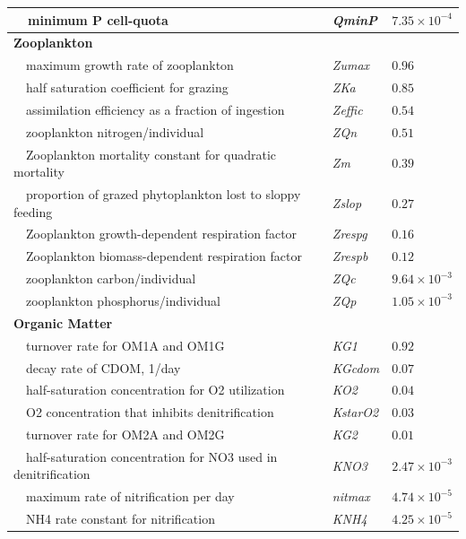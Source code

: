 \documentclass[letterpaper,12pt,oneside]{article}\usepackage[]{graphicx}\usepackage[]{color}
\begin{document}
\begin{table}[!tbp]
{\begin{center}
\begin{tabular}{lll}
~~minimum P cell-quota&\textit{QminP}&$7.35\times 10^{-4}$\tabularnewline
\hline
{\bfseries Zooplankton}&&\tabularnewline
~~maximum growth rate of zooplankton&\textit{Zumax}&$0.96$\tabularnewline
~~half saturation coefficient for grazing&\textit{ZKa}&$0.85$\tabularnewline
~~assimilation efficiency as a fraction of ingestion&\textit{Zeffic}&$0.54$\tabularnewline
~~zooplankton nitrogen/individual&\textit{ZQn}&$0.51$\tabularnewline
~~Zooplankton mortality constant for quadratic mortality&\textit{Zm}&$0.39$\tabularnewline
~~proportion of grazed phytoplankton lost to sloppy feeding&\textit{Zslop}&$0.27$\tabularnewline
~~Zooplankton growth-dependent respiration factor&\textit{Zrespg}&$0.16$\tabularnewline
~~Zooplankton biomass-dependent respiration factor&\textit{Zrespb}&$0.12$\tabularnewline
~~zooplankton carbon/individual&\textit{ZQc}&$9.64\times 10^{-3}$\tabularnewline
~~zooplankton phosphorus/individual&\textit{ZQp}&$1.05\times 10^{-3}$\tabularnewline
\hline
{\bfseries Organic Matter}&&\tabularnewline
~~turnover rate for OM1A and OM1G&\textit{KG1}&$0.92$\tabularnewline
~~decay rate of CDOM, 1/day&\textit{KGcdom}&$0.07$\tabularnewline
~~half-saturation concentration for O2 utilization&\textit{KO2}&$0.04$\tabularnewline
~~O2 concentration that inhibits denitrification&\textit{KstarO2}&$0.03$\tabularnewline
~~turnover rate for OM2A and OM2G&\textit{KG2}&$0.01$\tabularnewline
~~half-saturation concentration for NO3 used in denitrification&\textit{KNO3}&$2.47\times 10^{-3}$\tabularnewline
~~maximum rate of nitrification per day&\textit{nitmax}&$4.74\times 10^{-5}$\tabularnewline
~~NH4 rate constant for nitrification&\textit{KNH4}&$4.25\times 10^{-5}$\tabularnewline
\hline
\end{tabular}\end{center}}

\end{table}
\end{document}
